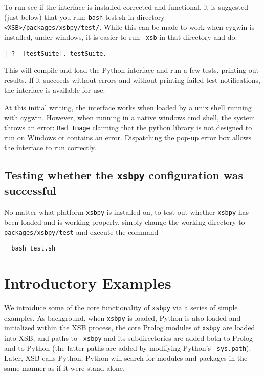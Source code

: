 To run see if the interface is installed corrected and functional, it
is suggested (just below) that you run: {\tt bash} test.sh in
directory {\tt <XSB>/packages/xsbpy/test/}.  While this can be made to
work when cygwin is installed, under windows, it is easier to run {\tt
  xsb} in that directory and do:
\begin{verbatim}
| ?- [testSuite], testSuite.
\end{verbatim}
This will compile and load the Python interface and run a few tests,
printing out results.  If it succeeds without errors and without
printing failed test notifications, the interface is available for
use.

At this initial writing, the interface works when loaded by a unix
shell running with cygwin.  However, when running in a native windows
cmd shell, the system throws an error: {\tt Bad Image} claiming that
the python library is not designed to run on Windows or contains an
error.  Dispatching the pop-up error box allows the interface to run
correctly.

\subsection{Testing whether the {\tt xsbpy} configuration was successful}

No matter what platform {\tt xsbpy} is installed on, to test out
whether {\tt xsbpy} has been loaded and is working properly, simply
change the working directory to {\tt packages/xsbpy/test} and execute the
command

\begin{verbatim}
  bash test.sh
\end{verbatim}


\section{Introductory Examples}

We introduce some of the core functionality of {\tt xsbpy} via a
series of simple examples.  As background, when {\tt xsbpy} is loaded,
Python is also loaded and initialized within the XSB process, the core
Prolog modules of {\tt xsbpy} are loaded into XSB, and paths to {\tt
  xsbpy} and its subdirectories are added both to Prolog and to Python
(the latter paths are added by modifying Python's {\tt
  sys.path}). Later, XSB calls Python, Python will search for modules
and packages in the same manner as if it were stand-alone.

